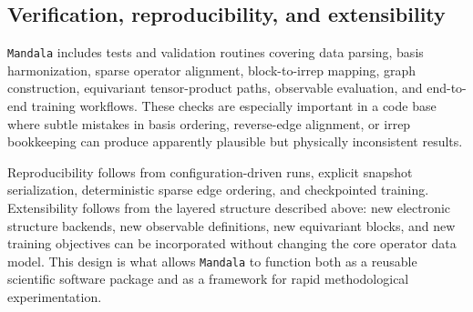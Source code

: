 \subsection{Verification, reproducibility, and extensibility}
\label{subsec:verification}

\texttt{Mandala} includes tests and validation routines covering data parsing, basis
harmonization, sparse operator alignment, block-to-irrep mapping, graph
construction, equivariant tensor-product paths, observable evaluation, and
end-to-end training workflows. These checks are especially important in a code
base where subtle mistakes in basis ordering, reverse-edge alignment, or irrep
bookkeeping can produce apparently plausible but physically inconsistent
results.

Reproducibility follows from configuration-driven runs, explicit snapshot
serialization, deterministic sparse edge ordering, and checkpointed training.
Extensibility follows from the layered structure described above: new electronic
structure backends, new observable definitions, new equivariant blocks, and new
training objectives can be incorporated without changing the core operator data
model. This design is what allows \texttt{Mandala} to function both as a reusable
scientific software package and as a framework for rapid methodological
experimentation.

